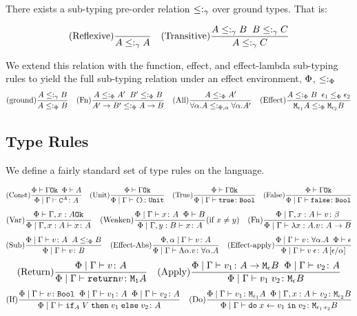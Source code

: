 \documentclass{Report}
\begin{document}
    There exists a sub-typing pre-order relation $\subtype_{\ground}$ over ground types. That is:

    \[
        \treerule{Reflexive}{}{A \subtype_{\ground} A}
        \quad
        \treerule{Transitive}{A \subtype_{\ground} B \s \s B \subtype_{\ground} C}{A \subtype_{\ground} C}
    \]

    We extend this relation with the function, effect, and effect-lambda sub-typing rules to yield the full sub-typing relation under an effect environment, $\P$, $\subtypep$
\[
    \treerule{ground}{A \subtype_{\ground} B}{A \subtypep B}
    \quad
    \treerule{Fn}{A \subtypep A' \s\s B' \subtypep B }{\fntype{A'}{B'} \subtypep \ab}
    \quad
    \treerule{All}{A\subtypep A'}{\all{\a}{A}\subtypepa\all{\a}{A'}}
    \quad
    \treerule{Effect}{A\subtypep B\s\s \e_1\subeffectp\e_2}{\M{\e_1}{A}\subtypep\M{\e_2}{B}}
\]


\subsection{Type Rules}
We define a fairly standard set of type rules on the language.

\[
    \treerule{Const}{\oke{\P}{\G}\s\s\wellformed{\P}{A}}{\gpetyperelation{\const{A}}{A}} 
    \quad
    \treerule{Unit}{\oke{\P}{\G}}{\gpetyperelation{\u}{\U}} 
    \quad
    \treerule{True}{\oke{\P}{\G}}{\gpetyperelation{\t}{\B}}
    \quad
    \treerule{False}{\oke{\P}{\G}}{\gpetyperelation{\f}{\B}}
\]
\[
\treerule{Var}{\oke{\P}{\gax}}{\etyperelation{\P}{\gax}{x}{A}}
\quad
\condtreerule{Weaken}{\etyperelation{\P}{\G}{x}{A}\s\s\wellformed{\P}{B}}{\etyperelation{\P}{\gby}{x}{A}}{x \neq y}
\quad
\treerule{Fn}{\etyperelation{\P}{\gax}{v}{\b}}{\etyperelation{\P}{\G}{\lam{x}{A}{v}}{\ab}}
\]
\[
    \treerule{Sub}{\etyperelation{\P}{\G}{v}{A}\s\s A \subtypep B}{\etyperelation{\P}{\G}{v}{B}}
    \quad
    \treerule{Effect-Abs}{\etyperelation{\P,\a}{\G}{v}{A}}{\gpetyperelation{\elam{\a}{v}}{\all{\a}{A}}}
    \quad
    \treerule{Effect-apply}{\gpetyperelation{v}{\all{\a}A}\s\s\wellformed{\P}{\e}}{\gpetyperelation{\eapp{v}{\e}}{A\ssub{\a}{\e}}}
\]
\[
    \treerule{Return}{\gpetyperelation{v}{A}}{\gpetyperelation{\return{v}}{\moa}}
    \quad
    \treerule{Apply}{\gpetyperelation{v_1}{\aeb}\s\s\gpetyperelation{v_2}{A}}{\gpetyperelation{\apply{v_1}{v_2}}{\meb}}
\]
\[
    \treerule{If}{\gpetyperelation{v}{\B} \s\s \gpetyperelation{v_1}{A}\s\s\gpetyperelation{v_2}{A}}{\gpetyperelation{\pifthenelse{A}{V}{v_1}{v_2}}{A}}
    \quad
    \treerule{Do}{\gpetyperelation{v_1}{\M{\e_1}{A}} \s\s \etyperelation{\P}{\gax}{v_2}{\M{\e_2}{B}}}{\gpetyperelation{\doin{x}{v_1}{v_2}}{\M{\e_1 \dot \e_2}{B}}}
\]
\end{document}
